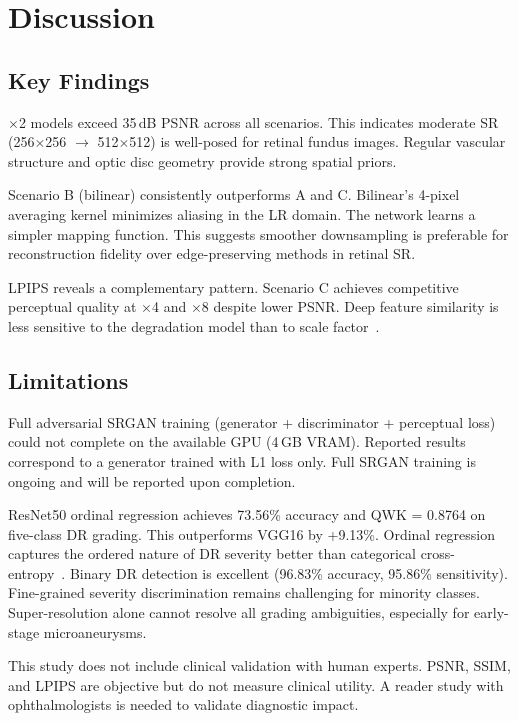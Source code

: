 \section{Discussion}
\label{sec:discussion}

\subsection{Key Findings}

$\times$2 models exceed 35\,dB PSNR across all scenarios.
This indicates moderate SR (256$\times$256 $\rightarrow$ 512$\times$512) is well-posed for retinal fundus images.
Regular vascular structure and optic disc geometry provide strong spatial priors.

Scenario B (bilinear) consistently outperforms A and C.
Bilinear's 4-pixel averaging kernel minimizes aliasing in the LR domain.
The network learns a simpler mapping function.
This suggests smoother downsampling is preferable for reconstruction fidelity over edge-preserving methods in retinal SR.

LPIPS reveals a complementary pattern.
Scenario C achieves competitive perceptual quality at $\times$4 and $\times$8 despite lower PSNR.
Deep feature similarity is less sensitive to the degradation model than to scale factor~\cite{zhang2018}.

\subsection{Limitations}

Full adversarial SRGAN training (generator + discriminator + perceptual loss) could not complete on the available GPU (4\,GB VRAM).
Reported results correspond to a generator trained with L1 loss only.
Full SRGAN training is ongoing and will be reported upon completion.

ResNet50 ordinal regression achieves 73.56\% accuracy and QWK = 0.8764 on five-class DR grading.
This outperforms VGG16 by +9.13\%.
Ordinal regression captures the ordered nature of DR severity better than categorical cross-entropy~\cite{he2016}.
Binary DR detection is excellent (96.83\% accuracy, 95.86\% sensitivity).
Fine-grained severity discrimination remains challenging for minority classes.
Super-resolution alone cannot resolve all grading ambiguities, especially for early-stage microaneurysms.

This study does not include clinical validation with human experts.
PSNR, SSIM, and LPIPS are objective but do not measure clinical utility.
A reader study with ophthalmologists is needed to validate diagnostic impact.

